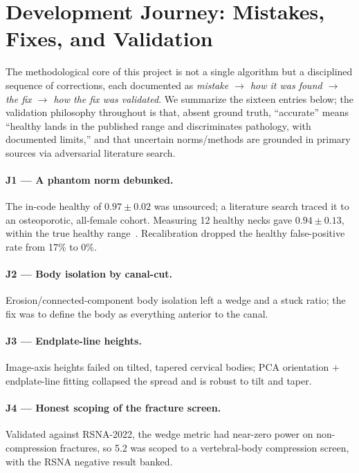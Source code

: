 \section{Development Journey: Mistakes, Fixes, and Validation}
\label{sec:journey}

The methodological core of this project is not a single algorithm but a disciplined sequence of
corrections, each documented as \emph{mistake $\rightarrow$ how it was found $\rightarrow$ the fix
$\rightarrow$ how the fix was validated}. We summarize the sixteen entries below; the validation
philosophy throughout is that, absent ground truth, ``accurate'' means ``healthy lands in the published
range and discriminates pathology, with documented limits,'' and that uncertain norms/methods are
grounded in primary sources via adversarial literature search.

\paragraph{J1 --- A phantom norm debunked.} The in-code healthy \hahp{} of $0.97\pm0.02$ was unsourced; a
literature search traced it to an osteoporotic, all-female cohort. Measuring 12 healthy necks gave
$0.94\pm0.13$, within the true healthy range~\cite{tan2004,lee2012,kaur2025}. Recalibration dropped the
healthy false-positive rate from 17\% to 0\%.

\paragraph{J2 --- Body isolation by canal-cut.} Erosion/connected-component body isolation left a wedge
and a stuck ratio; the fix was to define the body as everything anterior to the canal.

\paragraph{J3 --- Endplate-line heights.} Image-axis heights failed on tilted, tapered cervical bodies;
PCA orientation $+$ endplate-line fitting collapsed the spread and is robust to tilt and taper.

\paragraph{J4 --- Honest scoping of the fracture screen.} Validated against RSNA-2022, the wedge metric
had near-zero power on non-compression fractures, so 5.2 was scoped to a vertebral-body compression
screen, with the RSNA negative result banked.

